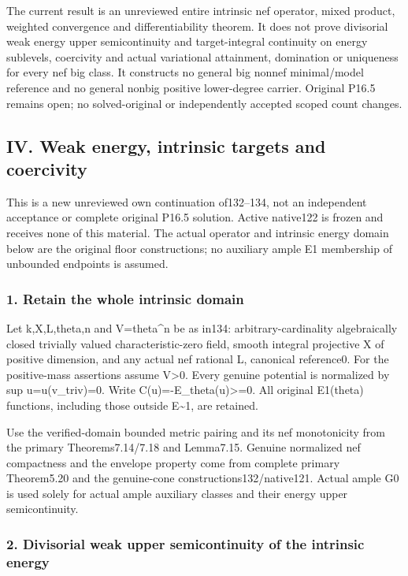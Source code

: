 \documentclass[
]{article}
\begin{document}
The current result is an unreviewed entire intrinsic nef
operator, mixed product, weighted convergence and differentiability theorem. It does not prove
divisorial weak energy upper semicontinuity and target-integral
continuity on energy sublevels, coercivity and actual variational
attainment, domination or uniqueness for every nef big class. It
constructs no general big nonnef minimal/model reference and no general
nonbig positive lower-degree carrier. Original P16.5 remains open; no
solved-original or independently accepted scoped count changes.

\subsection{IV. Weak energy, intrinsic targets and
coercivity}\label{iv.-weak-energy-intrinsic-targets-and-coercivity}

This is a new unreviewed own continuation of132--134, not an independent
acceptance or complete original P16.5 solution. Active native122 is
frozen and receives none of this material. The actual operator and
intrinsic energy domain below are the original floor constructions; no
auxiliary ample E1 membership of unbounded endpoints is assumed.

\subsubsection{1. Retain the whole intrinsic
domain}\label{retain-the-whole-intrinsic-domain}

Let k,X,L,theta,n and V=theta\^{}n be as in134: arbitrary-cardinality
algebraically closed trivially valued characteristic-zero field, smooth
integral projective X of positive dimension, and any actual nef rational
L, canonical reference0. For the positive-mass assertions assume
V\textgreater0. Every genuine potential is normalized by sup
u=u(v\_triv)=0. Write C(u)=-E\_theta(u)\textgreater=0. All original
E1(theta) functions, including those outside E\textasciitilde1, are
retained.

Use the verified-domain bounded metric pairing and its nef monotonicity
from the primary Theorems7.14/7.18 and Lemma7.15. Genuine normalized nef
compactness and the envelope property come from complete primary
Theorem5.20 and the genuine-cone constructions132/native121. Actual
ample G0 is used solely for actual ample auxiliary classes and their
energy upper semicontinuity.

\subsubsection{2. Divisorial weak upper semicontinuity of the intrinsic
energy}\label{divisorial-weak-upper-semicontinuity-of-the-intrinsic-energy}
\end{document}
